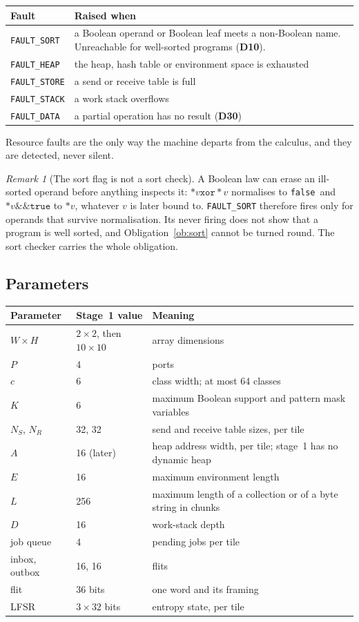 \documentclass[10.5pt,a4paper]{extarticle}
\newcommand{\kw}[1]{\texttt{#1}}
\newcommand{\tru}{\kw{true}}
\newcommand{\fls}{\kw{false}}
\newcommand{\band}{\mathbin{\&\&}}
\newcommand{\bxor}{\mathbin{\kw{xor}}}
\newcommand{\drp}[1]{{*}#1}
\newcommand{\dec}[1]{\textbf{D#1}}
\theoremstyle{definition}
\theoremstyle{remark}
\newtheorem{remark}{Remark}
\begin{document}
\medskip\noindent
\begin{tabularx}{\textwidth}{@{}l X@{}}
\toprule
Fault & Raised when\\
\midrule
\kw{FAULT\_SORT} & a Boolean operand or Boolean leaf meets a non-Boolean
                   name. Unreachable for well-sorted programs (\dec{10}).\\
\kw{FAULT\_HEAP} & the heap, hash table or environment space is exhausted\\
\kw{FAULT\_STORE} & a send or receive table is full\\
\kw{FAULT\_STACK} & a work stack overflows\\
\kw{FAULT\_DATA} & a partial operation has no result (\dec{30})\\
\bottomrule
\end{tabularx}

\medskip\noindent
Resource faults are the only way the machine departs from the calculus, and
they are detected, never silent.

\begin{remark}[The sort flag is not a sort check]
A Boolean law can erase an ill-sorted operand before anything inspects it:
$\drp{v} \bxor \drp{v}$ normalises to \fls\ and $\drp{v} \band \tru$ to
$\drp{v}$, whatever $v$ is later bound to. \kw{FAULT\_SORT} therefore fires
only for operands that survive normalisation. Its never firing does not show
that a program is well sorted, and Obligation~\ref{ob:sort} cannot be turned
round. The sort checker carries the whole obligation.
\end{remark}

\subsection{Parameters}

\noindent
\begin{tabularx}{\textwidth}{@{}l l X@{}}
\toprule
Parameter & Stage~1 value & Meaning\\
\midrule
$W \times H$ & $2 \times 2$, then $10 \times 10$ & array dimensions\\
$P$ & 4 & ports\\
$c$ & 6 & class width; at most 64 classes\\
$K$ & 6 & maximum Boolean support and pattern mask variables\\
$N_S$, $N_R$ & 32, 32 & send and receive table sizes, per tile\\
$A$ & 16 (later) & heap address width, per tile; stage~1 has no dynamic heap\\
$E$ & 16 & maximum environment length\\
$L$ & 256 & maximum length of a collection or of a byte string in chunks\\
$D$ & 16 & work-stack depth\\
job queue & 4 & pending jobs per tile\\
inbox, outbox & 16, 16 & flits\\
flit & 36 bits & one word and its framing\\
LFSR & $3 \times 32$ bits & entropy state, per tile\\
\bottomrule
\end{tabularx}
\end{document}
